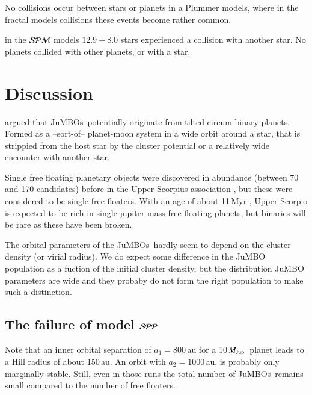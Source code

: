 \documentclass[aa]{lib/aa}
\newcommand{\MJup}{\mbox{${M}_{\rm Jup}$}}
\newcommand{\jumbo}{\mbox{JuMBO}}
\newcommand{\jumbos}{\mbox{JuMBOs}}
\begin{document}
No collisions occur between stars or planets in a Plummer models,
where in the fractal models collisions these events become rather
common.

in the ${\cal SPM}$ models $12.9\pm8.0$ stars experienced a collision
with another star. No planets collided with other planets, or with a
star.


\section{Discussion}


\citep{2023arXiv231015603C} argued that \jumbos\, potentially originate
from tilted circum-binary planets. Formed as a --sort-of-- planet-moon
system in a wide orbit around a star, that is strippied from the host
star by the cluster potential or a relatively wide encounter with
another star. 


Single free floating planetary objects were discovered in abundance
(between 70 and 170 candidates) before in the Upper Scorpius
association \citep{2022NatAs...6...89M}, but these were considered to
be single free floaters.  With an age of about 11\,Myr \citep{++},
Upper Scorpio is expected to be rich in single jupiter mass free
floating planets, but binaries will be rare as these have been broken.

The orbital parameters of the \jumbos\, hardly seem to depend on the
cluster density (or virial radius). We do expect some difference in
the \jumbo\, population as a fuction of the initial cluster density,
but the distribution \jumbo\, parameters are wide and they probaby do
not form the right population to make such a distinction.

\subsection{The failure of model ${\cal SPP}$}

Note that an inner orbital separation of $a_1=800$\,au for a
10\,\MJup\, planet leads to a Hill radius of about 150\,au. An orbit
with $a_2=1000$\,au, is probably only marginally stable.  Still,
even in those runs the total number of \jumbos\, remains small
compared to the number of free floaters.
\end{document}
